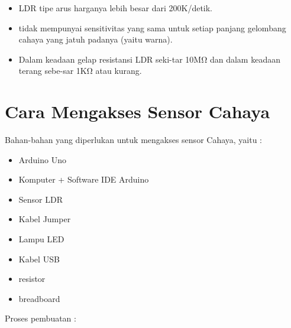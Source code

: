 \documentclass{article}
\begin{document}
\begin{itemize}
	\item LDR tipe arus harganya lebih besar dari 200K/detik.
	\item tidak mempunyai sensitivitas yang sama untuk setiap panjang gelombang cahaya yang jatuh padanya (yaitu warna).
	\item Dalam keadaan gelap resistansi LDR seki-tar 10MΩ dan dalam keadaan terang sebe-sar 1KΩ atau kurang.
\end{itemize}

\section{Cara Mengakses Sensor Cahaya}

\hspace{4mm} Bahan-bahan yang diperlukan untuk mengakses sensor Cahaya, yaitu :

\begin{itemize}
	\item Arduino Uno 
	\item Komputer + Software IDE Arduino
	\item Sensor LDR
	\item Kabel Jumper
	\item Lampu LED
	\item Kabel USB
	\item resistor
	\item breadboard
\end{itemize}

\break Proses pembuatan :
\end{document}
